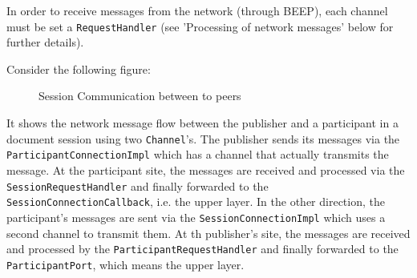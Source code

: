 In order to receive messages from the network (through BEEP), each channel must be set a \texttt{RequestHandler} (see 'Processing of network messages' below for further details).

Consider the following figure:

\begin{figure}[H]
 \centering
 \caption{Session Communication between to peers}
 \label{fig:network.protocol.requestcommunication}
\end{figure}

It shows the network message flow between the publisher and a participant in a document session using two \texttt{Channel}'s. The publisher sends its messages via the \texttt{ParticipantConnectionImpl} which has a channel that actually transmits the message. At the participant site, the messages are received and processed via the \texttt{Session\-Request\-Handler} and finally forwarded to the \texttt{SessionConnectionCallback}, i.e. the upper layer. In the other direction, the participant's messages are sent via the \texttt{SessionConnectionImpl} which uses a second channel to transmit them. At th publisher's site, the messages are received and processed by the \texttt{ParticipantRequestHandler} and finally forwarded to the \texttt{ParticipantPort}, which means the upper layer.

